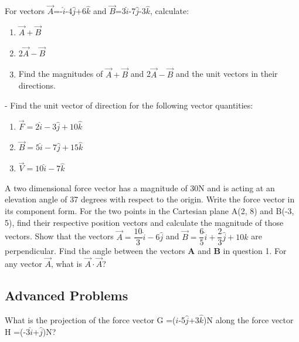 \documentclass[9pt]{exam}
\begin{document}
\begin{questions}
	\question For vectors  $\vec{A}$=-$\hat{i}$-4$\hat{j}$+6$\hat{k}$ and $\vec{B}$=3$\hat{i}$-7$\hat{j}$-3$\hat{k}$, calculate:
	\begin{enumerate}[label=(\Alph*)]
		\item $\vec{A}+\vec{B}$ 
		\item 2$\vec{A}-\vec{B}$
		\item Find the magnitudes of $\vec{A}+\vec{B}$ and 2$\vec{A}-\vec{B}$ and the unit vectors in their directions.
	\end{enumerate}
	-		\question Find the unit vector of direction for the following vector quantities:
	\begin{enumerate}[label=(\Roman*)]
		\item ${\vec{F}}=2\hat{i}-3\hat{j}+10\hat{k}$
		\item ${\vec{B}}=5\hat{i}-7\hat{j}+15\hat{k}$
		\item ${\vec{V}}=10\hat{i}-7\hat{k}$
	\end{enumerate}
	\question A two dimensional force vector has a magnitude of 30N and is acting at an elevation angle of 37 degrees with respect to the origin. Write the force vector in its component form. 
	\question For the two points in the Cartesian plane A(2, 8) and B(-3, 5), find their respective position vectors and calculate the magnitude of those vectors.
	\question Show that the vectors $\vec{A}=\dfrac{10}{3}\hat{i}-6\hat{j}$ and $\vec{B}=\dfrac{6}{5}\hat{i}+\dfrac{2}{3}\hat{j}+10\hat{k}$ are perpendicular.
	\question Find the angle between the vectors \textbf{A} and \textbf{B} in question 1.
	\question For any vector $\vec{A}$, what is $\vec{A}\cdot\vec{A}$?
	\subsection*{Advanced Problems}
	\question What is the projection of the force vector  G =($\hat{i}$-5$\hat{j}$+3$\hat{k}$)N along the force vector  H =(-3$\hat{i}$+$\hat{j}$)N?
\end{questions}		
\end{document}

